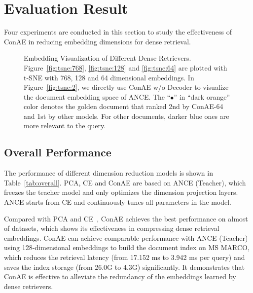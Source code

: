 \documentclass[11pt]{article}
\begin{document}
 \section{Evaluation Result}
Four experiments are conducted in this section to study the effectiveness of ConAE in reducing embedding dimensions for dense retrieval.

\begin{figure*}[t]
    \centering
    \caption{Embedding Visualization of Different Dense Retrievers. Figure~\ref{fig:tsne:768}, \ref{fig:tsne:128} and \ref{fig:tsne:64} are plotted with t-SNE with 768, 128 and 64 dimensional embeddings. In Figure~\ref{fig:tsne:2}, we directly use ConAE w/o Decoder to visualize the document embedding space of ANCE. The ``$\bullet$'' in ``dark orange'' color denotes the golden document that ranked 2nd by ConAE-64 and 1st by other models. For other documents, darker blue ones are more relevant to the query.}
    \label{fig:tsne}
\end{figure*} 
\subsection{Overall Performance}\label{sec:overall}
The performance of different dimension reduction models is shown in Table~\ref{tab:overall}. PCA, CE and ConAE are based on ANCE (Teacher), which freezes the teacher model and only optimizes the dimension projection layers. ANCE starts from CE and continuously tunes all parameters in the model.

Compared with PCA and CE~\cite{ma2021simple}, ConAE achieves the best performance on almost of datasets, which shows its effectiveness in compressing dense retrieval embeddings. ConAE can achieve comparable performance with ANCE (Teacher) using 128-dimensional embeddings to build the document index on MS MARCO, which reduces the retrieval latency (from 17.152 ms to 3.942 ms per query) and saves the index storage (from 26.0G to 4.3G) significantly. It demonstrates that ConAE is effective to alleviate the redundancy of the embeddings learned by dense retrievers.
\end{document}
